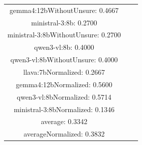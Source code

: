 \documentclass[a4paper]{article}
\begin{document}
\begin{tabular}{ccc}
gemma4:12bWithoutUnsure: 0.4667 \\ ministral-3:8b: 0.2700 \\ ministral-3:8bWithoutUnsure: 0.2700 \\ qwen3-vl:8b: 0.4000 \\ qwen3-vl:8bWithoutUnsure: 0.4000 \\ llava:7bNormalized: 0.2667 \\ gemma4:12bNormalized: 0.5600 \\ qwen3-vl:8bNormalized: 0.5714 \\ ministral-3:8bNormalized: 0.1346 \\ average: 0.3342 \\ averageNormalized: 0.3832 \end{minipage}\\
\end{tabular}

\vspace{5mm}
\end{document}
